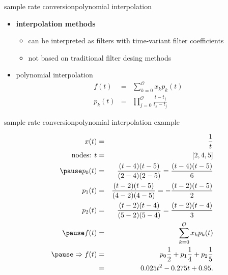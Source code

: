 	\begin{frame}{sample rate conversion}{polynomial interpolation}
        \begin{itemize}
            \item   \textbf{interpolation methods }
                \begin{itemize}
                    \item   can be interpreted as filters with time-variant filter coefficients
                    \item   not based on traditional filter desing methods
                \end{itemize}
            \pause
            \item   polynomial interpolation
                \begin{eqnarray*}
                    f(t) &=& \sum\limits_{k=0}^\mathcal{O}x_k p_k(t)\\
                    p_k(t) &=& \prod\limits_{j=0}^\mathcal{O}\frac{t-t_j}{t_k-t_j}
                \end{eqnarray*}
        \end{itemize}
    \end{frame}
	\begin{frame}{sample rate conversion}{polynomial interpolation example}
        \vspace{-5mm}
        \begin{footnotesize}
        \begin{eqnarray*}
            x(t) &=& \frac{1}{t}\\
            \text{nodes: } t &=& [2, 4, 5]\\
            \pause
            p_0(t) &=& \frac{(t-4)(t-5)}{(2-4)(2-5)} = \frac{(t-4)(t-5)}{6}\\
            p_1(t) &=& \frac{(t-2)(t-5)}{(4-2)(4-5)} = -\frac{(t-2)(t-5)}{2}\\
            p_2(t) &=& \frac{(t-2)(t-4)}{(5-2)(5-4)} = \frac{(t-2)(t-4)}{3}\\
            \pause
             f(t) &=& \sum\limits_{k=0}^\mathcal{O}x_k p_k(t)\\
            \pause
            \Rightarrow f(t) &=& p_0\frac{1}{2}+p_1\frac{1}{4}+p_2\frac{1}{5}\\
            &=& 0.025t^2 - 0.275t + 0.95 .
        \end{eqnarray*}
        \end{footnotesize}
    \end{frame}

